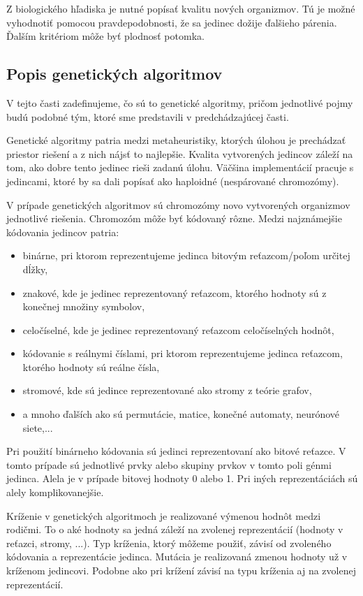 Z biologického hľadiska je nutné popísať kvalitu nových organizmov. Tú je možné vyhodnotiť pomocou pravdepodobnosti, že sa jedinec dožije ďalšieho párenia. Ďalším kritériom môže byť plodnosť potomka.

\subsection{Popis genetických algoritmov}
V tejto časti zadefinujeme, čo sú to genetické algoritmy, pričom jednotlivé pojmy budú podobné tým, ktoré sme predstavili v predchádzajúcej časti. 

Genetické algoritmy patria medzi metaheuristiky, ktorých úlohou je prechádzať priestor riešení a z nich nájsť to najlepšie. Kvalita vytvorených jedincov záleží na tom, ako dobre tento jedinec rieši zadanú úlohu. Väčšina implementácií pracuje s jedincami, ktoré by sa dali popísať ako haploidné (nespárované chromozómy).

V prípade genetických algoritmov sú chromozómy novo vytvorených organizmov jednotlivé riešenia. Chromozóm môže byť kódovaný rôzne. Medzi najznámejšie kódovania jedincov patria:
\begin{itemize}
\item binárne, pri ktorom reprezentujeme jedinca bitovým reťazcom/poľom určitej dĺžky,
\item znakové, kde je jedinec reprezentovaný reťazcom, ktorého hodnoty sú z konečnej množiny symbolov,
\item celočíselné, kde je jedinec reprezentovaný reťazcom celočíselných hodnôt,
\item kódovanie s reálnymi číslami, pri ktorom reprezentujeme jedinca reťazcom, ktorého hodnoty sú reálne čísla,
\item stromové, kde sú jedince reprezentované ako stromy z teórie grafov,
\item a mnoho ďalších ako sú permutácie, matice, konečné automaty, neurónové siete,...
\end{itemize}
Pri použití binárneho kódovania sú jedinci reprezentovaní ako bitové reťazce. V tomto prípade sú jednotlivé prvky alebo skupiny prvkov v tomto poli génmi jedinca. Alela je v prípade bitovej hodnoty 0 alebo 1. Pri iných reprezentáciách sú alely komplikovanejšie.

Kríženie v genetických algoritmoch je realizované výmenou hodnôt medzi rodičmi. To o aké hodnoty sa jedná záleží na zvolenej reprezentácií (hodnoty v reťazci, stromy, ...). Typ kríženia, ktorý môžeme použiť, závisí od zvoleného kódovania a reprezentácie jedinca. 
Mutácia je realizovaná zmenou hodnoty už v kríženom jedincovi. Podobne ako pri krížení závisí na typu kríženia aj na zvolenej reprezentácií. 


